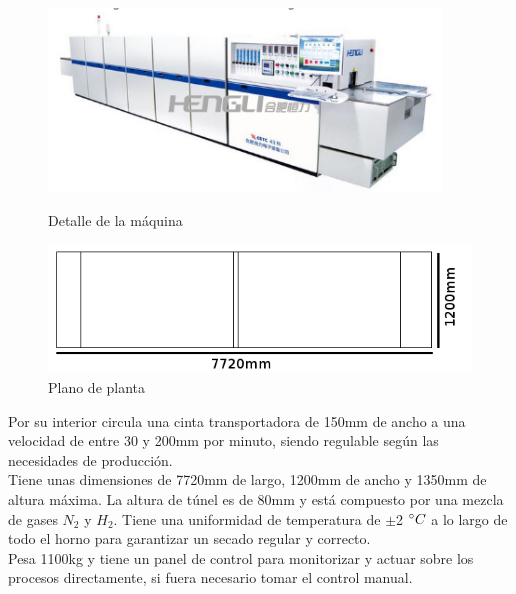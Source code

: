 	
	\begin{figure}[htp]
		\begin{minipage}{.48\textwidth}
			\centering
			\includegraphics[scale=0.5]{Datasheets/1HornoFoto.png}
			\caption{Detalle de la máquina}
			\label{fig:testa}
		\end{minipage}
		\begin{minipage}{.48\textwidth}
			\centering
			\includegraphics[scale=0.5]{Datasheets/Miniaturas/horno.png}
			\caption{Plano de planta}
			\label{fig:testb}
		\end{minipage}
	\end{figure}

	Por su interior circula una cinta transportadora de 150mm de ancho a una velocidad de entre 30 y 200mm por minuto, siendo regulable según las necesidades de producción.\\

	Tiene unas dimensiones de 7720mm de largo, 1200mm de ancho y 1350mm de altura máxima. La altura de túnel es de 80mm y está compuesto por una mezcla de gases $N_2$ y $H_2$. Tiene una uniformidad de temperatura de $\pm$2 $\degree C$ a lo largo de todo el horno para garantizar un secado regular y correcto.\\

	Pesa 1100kg y tiene un panel de control para monitorizar y actuar sobre los procesos directamente, si fuera necesario tomar el control manual.

